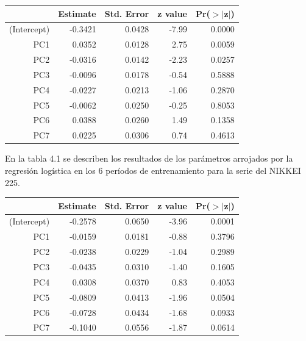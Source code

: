 \documentclass[a4paper,12pt]{Latex/Classes/PhDthesisPSnPDF}
\begin{document}
\begin{center}
\begin{table}[ht]
\centering
\begin{tabular}{rrrrr}
  \hline
 & Estimate & Std. Error & z value & Pr($>$$|$z$|$) \\ 
  \hline
(Intercept) & -0.3421 & 0.0428 & -7.99 & 0.0000 \\ 
  PC1 & 0.0352 & 0.0128 & 2.75 & 0.0059 \\ 
  PC2 & -0.0316 & 0.0142 & -2.23 & 0.0257 \\ 
  PC3 & -0.0096 & 0.0178 & -0.54 & 0.5888 \\ 
  PC4 & -0.0227 & 0.0213 & -1.06 & 0.2870 \\ 
  PC5 & -0.0062 & 0.0250 & -0.25 & 0.8053 \\ 
  PC6 & 0.0388 & 0.0260 & 1.49 & 0.1358 \\ 
  PC7 & 0.0225 & 0.0306 & 0.74 & 0.4613 \\ 
   \hline
\end{tabular}
\end{table}\end{center}


En la tabla 4.1 se describen los resultados de los parámetros arrojados por la regresión logística en los 6 períodos de entrenamiento para la serie del NIKKEI 225.
\begin{center}
\begin{table}[ht]
\centering
\begin{tabular}{rrrrr}
  \hline
 & Estimate & Std. Error & z value & Pr($>$$|$z$|$) \\ 
  \hline
(Intercept) & -0.2578 & 0.0650 & -3.96 & 0.0001 \\ 
  PC1 & -0.0159 & 0.0181 & -0.88 & 0.3796 \\ 
  PC2 & -0.0238 & 0.0229 & -1.04 & 0.2989 \\ 
  PC3 & -0.0435 & 0.0310 & -1.40 & 0.1605 \\ 
  PC4 & 0.0308 & 0.0370 & 0.83 & 0.4053 \\ 
  PC5 & -0.0809 & 0.0413 & -1.96 & 0.0504 \\ 
  PC6 & -0.0728 & 0.0434 & -1.68 & 0.0933 \\ 
  PC7 & -0.1040 & 0.0556 & -1.87 & 0.0614 \\ 
   \hline
\end{tabular}
\end{table}\end{center}
\end{document}
